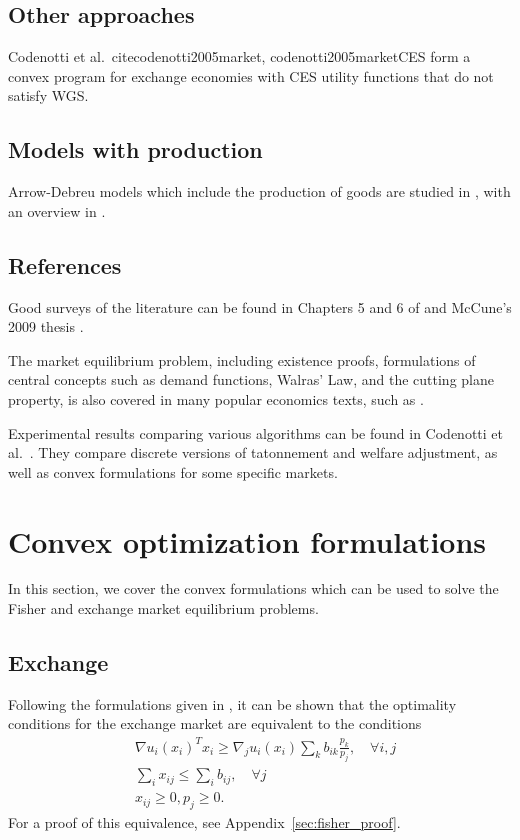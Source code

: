 \documentclass[12pt]{article}
\begin{document}
\subsection{Other approaches}
Codenotti et al.\ cite{codenotti2005market, codenotti2005marketCES} form a
convex program for exchange economies with CES utility functions that do not
satisfy WGS.

\subsection{Models with production}
Arrow-Debreu models which include the production of goods are studied
in \cite{garg2014computability,jain2005market,codenotti2005marketExcess},
with an overview in \cite[Chapters~5--6]{nisan2007algorithmic}.

\subsection{References}
Good surveys of the literature can be found in Chapters 5 and 6 of
\cite{nisan2007algorithmic} and McCune's 2009 thesis \cite{mccune2009algorithmic}.

The market equilibrium problem, including existence proofs, formulations of
central concepts such as demand functions, Walras' Law, and the cutting plane
property, is also covered in many popular economics texts, such as
\cite{varian1992microeconomic, mas1995microeconomic,
luenberger1995microeconomic, kreps1990course}.

Experimental results comparing various algorithms can be found in Codenotti
et al.\ \cite{codenotti2008experimental}.
They compare discrete versions of tatonnement and welfare adjustment,
as well as convex formulations for some specific markets.


\section{Convex optimization formulations}
In this section, we cover the convex formulations which can be used to solve
the Fisher and exchange market equilibrium problems.

\subsection{Exchange}
Following the formulations given in \cite{jain2007polynomial, chen2007note, nenakov1983algorithm}, it can be shown that the optimality conditions for 
the exchange market are equivalent to the conditions
\[
\begin{array}{ll}
& \nabla u_i(x_i)^T x_i \geq  \nabla_j u_i(x_i) \sum_k b_{ik} \frac{p_k}{p_j}, \quad \forall i,j\\
& \sum_i x_{ij} \leq \sum_i b_{ij},\quad \forall j\\
& x_{ij} \geq 0, p_j \geq 0.
\end{array}
\]
For a proof of this equivalence, see Appendix~\ref{sec:fisher_proof}.
\end{document}

